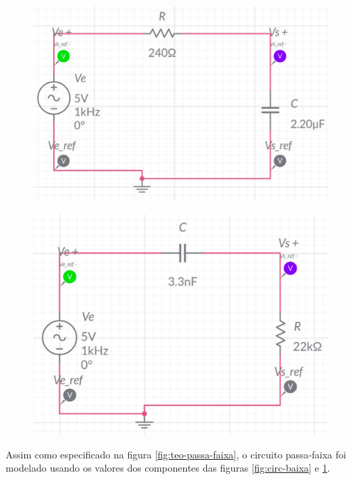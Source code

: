 \documentclass{article}
\begin{document}
\begin{figure}[ht!]
  \begin{minipage}{.48\textwidth}
    \centering
    \includegraphics[width=\textwidth]{fig/circ-baixa.png}
    \label{fig:circ-baixa}
  \end{minipage}%
  \hfill%
  \begin{minipage}{.48\textwidth}
    \centering
    \includegraphics[width=\textwidth]{fig/circ-alta.png}
    \label{fig:circ-alta}
  \end{minipage}
\end{figure}

Assim como especificado na figura \ref{fig:teo-passa-faixa}, o circuito passa-faixa foi modelado usando os valores dos componentes das figuras \ref{fig:circ-baixa} e \ref{fig:circ-alta}.
\end{document}
